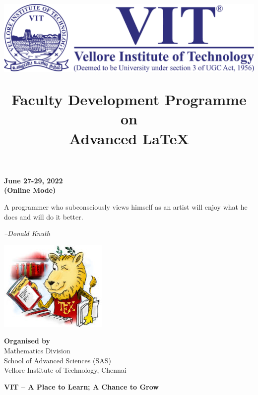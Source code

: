 
	\title{
		\includegraphics[width=.5\textwidth]{img/vitlogo}
		
		\Large\color{Maroon}\setmainfont{calligrapher}
		\bf
		Faculty Development Programme \\ on \\
		\Huge Advanced \LaTeX
	}
	\date{}



\maketitle

\vspace{-5\baselineskip}
\begin{center}
	\large \bf
	June 27-29, 2022 \\
\textcolor{secondaryColor}{(Online Mode)}
\end{center}



\begin{shadequote}
	
	\vspace{10pt}
	A programmer who subconsciously views himself as an artist will enjoy what he does and will do it better.
	
	\hfill \emph{--Donald Knuth}
	
\end{shadequote}

\begin{center}
	\includegraphics[width=.6\textwidth]{img/lion}
\end{center}
\vspace{-2\baselineskip}
\begin{center}
\textcolor{primaryColor}{\textbf{Organised by}} \\
Mathematics Division\\
School of Advanced Sciences (SAS)\\
Vellore Institute of Technology, Chennai
\end{center}
%
\begin{center}
	\color{primaryColor} 
	\small \bf
	VIT -- A Place to Learn; A Chance to Grow
\end{center}

